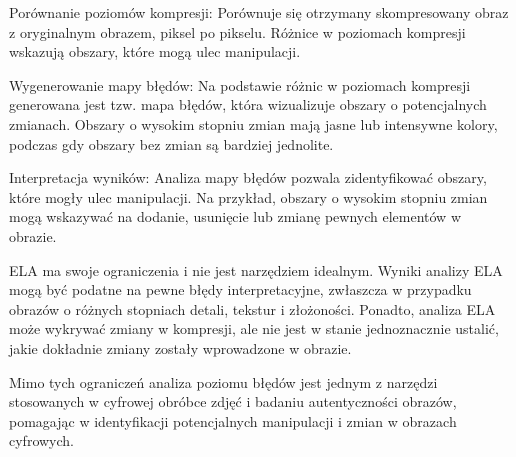 Porównanie poziomów kompresji: Porównuje się otrzymany skompresowany obraz z oryginalnym obrazem, piksel po pikselu.
Różnice w poziomach kompresji wskazują obszary, które mogą ulec manipulacji.

Wygenerowanie mapy błędów: Na podstawie różnic w poziomach kompresji generowana jest tzw.
mapa błędów, która wizualizuje obszary o potencjalnych zmianach.
Obszary o wysokim stopniu zmian mają jasne lub intensywne kolory, podczas gdy obszary bez zmian są bardziej jednolite.

Interpretacja wyników: Analiza mapy błędów pozwala zidentyfikować obszary, które mogły ulec manipulacji.
Na przykład, obszary o wysokim stopniu zmian mogą wskazywać na dodanie, usunięcie lub zmianę pewnych elementów w obrazie.

ELA ma swoje ograniczenia i nie jest narzędziem idealnym.
Wyniki analizy ELA mogą być podatne na pewne błędy interpretacyjne, zwłaszcza w przypadku obrazów o różnych stopniach detali, tekstur i złożoności.
Ponadto, analiza ELA może wykrywać zmiany w kompresji, ale nie jest w stanie jednoznacznie ustalić, jakie dokładnie zmiany zostały wprowadzone w obrazie.

Mimo tych ograniczeń analiza poziomu błędów jest jednym z narzędzi stosowanych w cyfrowej obróbce zdjęć i badaniu autentyczności obrazów, pomagając w identyfikacji potencjalnych manipulacji i zmian w obrazach cyfrowych.